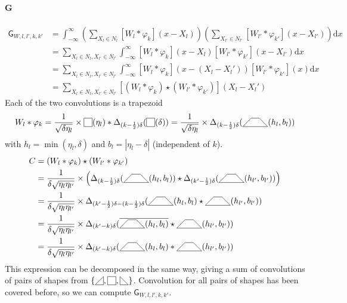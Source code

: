 \documentclass[a4paper,10pt]{article}
\newcommand\Shifted[2]{\Delta_{#1}(#2)}
\newcommand\Reversed[1]{\overline{#1}} %
\newcommand\SymSquare{\begin{tikzpicture}[baseline=0.5ex]%
        \draw (0,0) -- (0,1em) -- (1em,1em) -- (1em,0) -- cycle;
\end{tikzpicture}}
\newcommand\Indicator[1]{\SymSquare(#1)}
\newcommand\SymPositiveTriangle{\begin{tikzpicture}[baseline=0.5ex]%
        \draw (0,0) -- (1em,0em) -- (1em,1em) -- cycle;
\end{tikzpicture}}
\newcommand\SymNegativeTriangle{\begin{tikzpicture}[baseline=0.5ex]%
        \draw (0,0) -- (0,1em) -- (1em,0em) -- cycle;
\end{tikzpicture}}
\newcommand\SymTrapezoid{\begin{tikzpicture}[baseline=0.5ex]%
        \draw (0,0) -- (3em,0) -- (2em,1em) -- (1em,1em) -- cycle;
\end{tikzpicture}}
\newcommand\Trapezoid[2]{\SymTrapezoid(#1,#2)}%
\newcommand\D{\mathrm{d}}
\newcommand\Convolution{\ast}
\newcommand\Correlation{\star}
\newcommand\IntR[2]{\int_{-\infty}^{\infty}#1 \D#2}
\begin{document}
\paragraph{G}
\[ \begin{split}
    \mathsf{G}_{W,l,l',k,k'} & = \IntR{\left( \sum_{X_l \in N_l} [W_l \Convolution \varphi_k](x-X_l) \right)\left( \sum_{X_{l'} \in N_{l'}} [W_{l'} \Convolution \varphi_{k'}](x-X_{l'}) \right)}{x} \\
    & = \sum_{X_l \in N_l, X_{l'} \in N_{l'}} \IntR{ [W_l \Convolution \varphi_k](x-X_l) [W_{l'} \Convolution \varphi_{k'}](x-X_{l'}) }{x} \\
    & = \sum_{X_l \in N_l, X_{l'} \in N_{l'}} \IntR{ [W_l \Convolution \varphi_k](x-(X_l-X_l')) [W_{l'} \Convolution \varphi_{k'}](x) }{x} \\
    & = \sum_{X_l \in N_l, X_{l'} \in N_{l'}} [(W_l \Convolution \varphi_k) \Correlation (W_{l'} \Convolution \varphi_{k'})] (X_l-X_l')
\end{split} \]
Each of the two convolutions is a trapezoid
\[
    W_l \Convolution \varphi_k =
    \frac{1}{\sqrt{\delta \eta_l}} \times \Indicator{\eta_l} \Convolution \Shifted{(k-\frac{1}{2})\delta}{\Indicator{\delta}} =
    \frac{1}{\sqrt{\delta \eta_l}} \times \Shifted{(k-\frac{1}{2})\delta}{\Trapezoid{h_l}{b_l}}
\]
with $h_l = \min(\eta_l,\delta)$ and $b_l = |\eta_l - \delta|$ (independent of $k$).
\[ \begin{split}
    C
    & = (W_l \Convolution \varphi_k) \Correlation (W_{l'} \Convolution \varphi_{k'}) \\
    & = \frac{1}{\delta \sqrt{\eta_l \eta_{l'}}} \times \left( \Shifted{(k-\frac{1}{2})\delta}{\Trapezoid{h_l}{b_l}} \Correlation \Shifted{(k'-\frac{1}{2})\delta}{\Trapezoid{h_{l'}}{b_{l'}}} \right) \\
    & = \frac{1}{\delta \sqrt{\eta_l \eta_{l'}}} \times \Shifted{(k'-\frac{1}{2})\delta - (k-\frac{1}{2})\delta}{\Trapezoid{h_l}{b_l} \Correlation \Trapezoid{h_{l'}}{b_{l'}}} \\
    & = \frac{1}{\delta \sqrt{\eta_l \eta_{l'}}} \times \Shifted{(k'-k)\delta}{\Reversed{\Trapezoid{h_l}{b_l}} \Correlation \Trapezoid{h_{l'}}{b_{l'}}} \\
    & = \frac{1}{\delta \sqrt{\eta_l \eta_{l'}}} \times \Shifted{(k'-k)\delta}{\Trapezoid{h_l}{b_l} \Convolution \Trapezoid{h_{l'}}{b_{l'}}}
\end{split} \]
This expression can be decomposed in the same way, giving a sum of convolutions of pairs of shapes from $\{\SymPositiveTriangle, \SymSquare, \SymNegativeTriangle \}$.
Convolution for all pairs of shapes has been covered before, so we can compute $\mathsf{G}_{W,l,l',k,k'}$.
\end{document}
